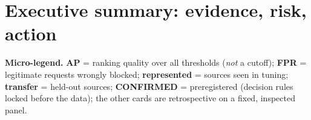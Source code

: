 \section*{Executive summary: evidence, risk, action}
\label{sec:exec}

\noindent\footnotesize\textbf{Micro-legend.}
\textbf{AP} = ranking quality over all thresholds (\emph{not} a cutoff);
\textbf{FPR} = legitimate requests wrongly blocked;
\textbf{represented} = sources seen in tuning;
\textbf{transfer} = held-out sources;
\textcolor{tkgreenedge}{\textbf{CONFIRMED}} = preregistered (decision rules locked before the data);
the other cards are retrospective on a fixed, inspected panel. \normalsize

\smallskip

\newcommand{\ericard}[6]{%
  \begin{tcolorbox}[colback=#1,colframe=#2,coltitle=white,fonttitle=\bfseries\footnotesize,
    fontupper=\footnotesize,boxrule=0.8pt,arc=2pt,left=4pt,right=4pt,top=3pt,bottom=3pt,title={#3}]
    \textbf{Evidence.}~#4\par\smallskip
    \textbf{Risk.}~#5\par\smallskip
    \textbf{Action.}~#6
  \end{tcolorbox}}

